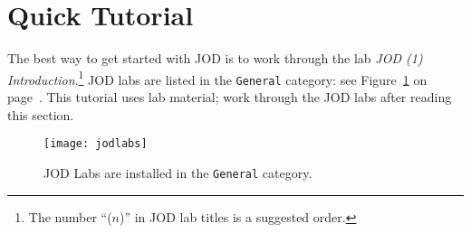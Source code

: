 \section{Quick Tutorial}

The best way to get started with JOD is to work through the
lab \emph{JOD (1) Introduction}.\footnote{
The number ``($n$)'' in JOD lab titles is a suggested order.}
JOD labs are listed in the \texttt{General} category: see 
Figure~\ref{eps:jodlabs} on page~\pageref{eps:jodlabs}.  This tutorial
uses lab material; work through the JOD labs after reading this section.


\begin{figure}[htbp]
  \centering
  \texttt{[image: jodlabs]}
  \caption[JOD Labs]{JOD Labs are installed in the \texttt{General} category.}
   \label{eps:jodlabs}
\end{figure}


